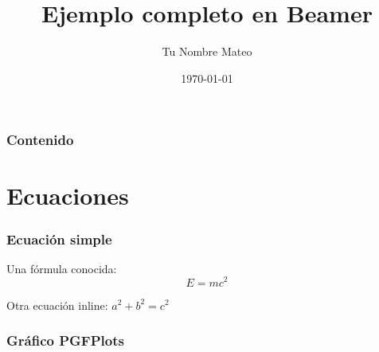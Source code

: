 \documentclass{beamer}
\title{Ejemplo completo en Beamer}
\author{Tu Nombre Mateo}
\institute{Tu Institución Udp}
\date{\today}
\begin{document}
\begin{frame}
  \titlepage
  \end{frame}

\begin{frame}
  \frametitle{Contenido}
  \tableofcontents
\end{frame}

\section{Ecuaciones}

\begin{frame}
  \frametitle{Ecuación simple}
  Una fórmula conocida:
  \[
    E = mc^2
  \]

  Otra ecuación inline: \( a^2 + b^2 = c^2 \)
\end{frame}
\begin{frame}
    \frametitle{Gráfico PGFPlots}
  \end{frame}
\end{document}
